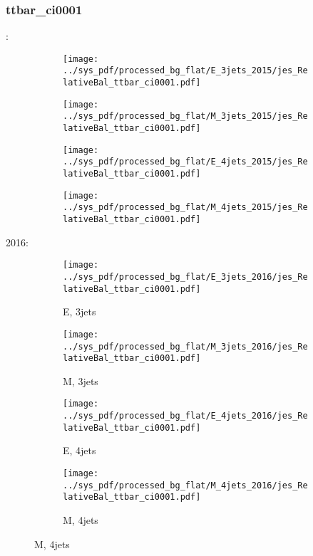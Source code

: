 \documentclass{beamer}
\begin{document}
\begin{frame}
\frametitle{ttbar_ci0001}
\fontsize{5}{1}:
\begin{figure}
\centering
\begin{subfigure}[b]{0.24\textwidth}
\texttt{[image: ../sys\_pdf/processed\_bg\_flat/E\_3jets\_2015/jes\_RelativeBal\_ttbar\_ci0001.pdf]}
\end{subfigure}
\begin{subfigure}[b]{0.24\textwidth}
\texttt{[image: ../sys\_pdf/processed\_bg\_flat/M\_3jets\_2015/jes\_RelativeBal\_ttbar\_ci0001.pdf]}
\end{subfigure}
\begin{subfigure}[b]{0.24\textwidth}
\texttt{[image: ../sys\_pdf/processed\_bg\_flat/E\_4jets\_2015/jes\_RelativeBal\_ttbar\_ci0001.pdf]}
\end{subfigure}
\begin{subfigure}[b]{0.24\textwidth}
\texttt{[image: ../sys\_pdf/processed\_bg\_flat/M\_4jets\_2015/jes\_RelativeBal\_ttbar\_ci0001.pdf]}
\end{subfigure}
\end{figure}
2016:
\begin{figure}
\centering
\begin{subfigure}[b]{0.24\textwidth}
\texttt{[image: ../sys\_pdf/processed\_bg\_flat/E\_3jets\_2016/jes\_RelativeBal\_ttbar\_ci0001.pdf]}
\captionsetup{font=tiny}
\caption{E, 3jets}
\end{subfigure}
\begin{subfigure}[b]{0.24\textwidth}
\texttt{[image: ../sys\_pdf/processed\_bg\_flat/M\_3jets\_2016/jes\_RelativeBal\_ttbar\_ci0001.pdf]}
\captionsetup{font=tiny}
\caption{M, 3jets}
\end{subfigure}
\begin{subfigure}[b]{0.24\textwidth}
\texttt{[image: ../sys\_pdf/processed\_bg\_flat/E\_4jets\_2016/jes\_RelativeBal\_ttbar\_ci0001.pdf]}
\captionsetup{font=tiny}
\caption{E, 4jets}
\end{subfigure}
\begin{subfigure}[b]{0.24\textwidth}
\texttt{[image: ../sys\_pdf/processed\_bg\_flat/M\_4jets\_2016/jes\_RelativeBal\_ttbar\_ci0001.pdf]}
\captionsetup{font=tiny}
\caption{M, 4jets}
\end{subfigure}
\end{figure}
\end{frame}
\end{document}
